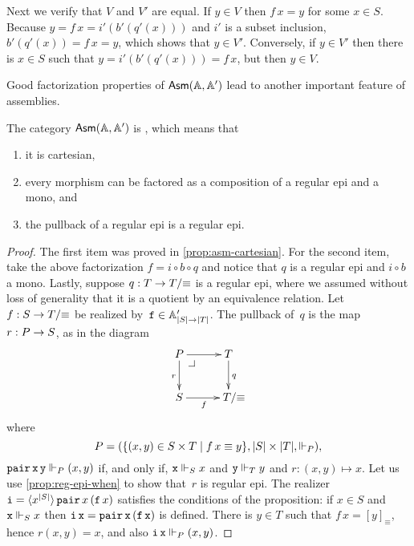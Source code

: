 Next we verify that $V$ and $V'$ are equal. If $y \in V$ then $f\,x =
y$ for some $x \in S$. Because $y = f\,x = i'(b'(q'(x)))$ and $i'$ is
a subset inclusion, $b'(q'(x)) = f\,x = y$, which shows that $y \in
V'$. Conversely, if $y \in V'$ then there is $x \in S$ such that $y =
i'(b'(q'(x))) = f\,x$, but then $y \in V$.

Good factorization properties of $\AsmA$ lead to another important
feature of assemblies.

\begin{proposition}
  \label{prop:asm-regular}%
  The category $\AsmA$ is , which means that
  \begin{enumerate}
  \item it is cartesian,
  \item every morphism can be factored as a composition of a regular
    epi and a mono, and
  \item the pullback of a regular epi is a regular epi.
  \end{enumerate}
\end{proposition}

\begin{proof}
  The first item was proved in \cref{prop:asm-cartesian}.
  For the second item, take the above factorization $f = i \circ b
  \circ q$ and notice that $q$ is a regular epi and $i \circ b$ a
  mono. Lastly, suppose $q : \asm{T} \to \asm{T}/{\equiv}$ is a
  regular epi, where we assumed without loss of generality that it is
  a quotient by an equivalence relation. Let $f : \asm{S} \to
  \asm{T}/{\equiv}$ be realized by~$\R{f} \in \subAtyp{|S| \to |T|}$.
  The pullback of~$q$ is the map $r : \asm{P} \to \asm{S}$, as in the
  diagram
  \begin{equation*}
    \xymatrix{
      {\asm{P}} \pbcorner
      \ar[r]
      \ar[d]_{r}
      &
      {\asm{T}}
      \ar[d]^{q}
      \\
      {\asm{S}}
      \ar[r]_{f}
      &
      **[r]{\asm{T}/{\equiv}}
      }
  \end{equation*}
  where
  \begin{equation*}
    \asm{P} = (\set{(x,y) \in S \times T \such f\,x \equiv y},
               |S| \times |T|, {\rz[P]}),
  \end{equation*}
  $\combPair\,\R{x}\,\R{y} \rz[P] (x,y)$ if, and only if, $\R{x} \rz[S]
  x$ and $\R{y} \rz[T] y$ and $r : (x,y) \mapsto x$. Let us use
  \cref{prop:reg-epi-when} to show that~$r$ is regular epi.
  The realizer $\R{i} =
  \tpcalam{x}{|S|}{\combPair\,x\,(\R{f}\,x)}$ satisfies the
  conditions of the proposition: if $x \in S$ and $\R{x} \rz[S] x$ then
  $\R{i}\,\R{x} = \combPair\,\R{x}\,(\R{f}\,\R{x})$ is defined. There
  is $y \in T$ such that $f\,x = [y]_{\equiv}$, hence $r (x, y) = x$,
  and also $\R{i}\,\R{x} \rz[P] (x, y)$.
\end{proof}

